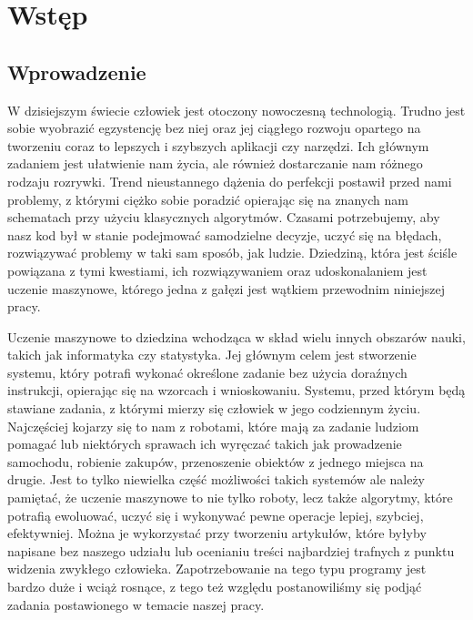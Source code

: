 \chapter{Wstęp}
\label{cha:wstep}

\section{Wprowadzenie}
\label{sec:wprowadzenie}

W dzisiejszym świecie człowiek jest otoczony nowoczesną technologią. Trudno jest sobie wyobrazić egzystencję bez niej oraz jej ciągłego rozwoju opartego na tworzeniu coraz to lepszych i szybszych aplikacji czy narzędzi. Ich głównym zadaniem jest ułatwienie nam życia, ale również dostarczanie nam różnego rodzaju rozrywki. Trend nieustannego dążenia do perfekcji postawił przed nami problemy, z którymi ciężko sobie poradzić opierając się na znanych nam schematach przy użyciu klasycznych algorytmów. Czasami potrzebujemy, aby nasz kod był w stanie podejmować samodzielne decyzje, uczyć się na błędach, rozwiązywać problemy w taki sam sposób, jak ludzie. Dziedziną, która jest ściśle powiązana z tymi kwestiami, ich rozwiązywaniem oraz udoskonalaniem jest uczenie maszynowe, którego jedna z gałęzi jest wątkiem przewodnim niniejszej pracy.
    
    Uczenie maszynowe to dziedzina wchodząca w skład wielu innych obszarów nauki, takich jak informatyka czy statystyka. Jej głównym celem jest stworzenie systemu, który potrafi wykonać określone zadanie bez użycia doraźnych instrukcji, opierając się na wzorcach i wnioskowaniu. Systemu, przed którym będą stawiane zadania, z którymi mierzy się człowiek w jego codziennym życiu. Najczęściej kojarzy się to nam z robotami, które mają za zadanie ludziom pomagać lub niektórych sprawach ich wyręczać takich jak prowadzenie samochodu, robienie zakupów, przenoszenie obiektów z jednego miejsca na drugie. Jest to tylko niewielka część możliwości takich systemów ale należy pamiętać, że uczenie maszynowe to nie tylko roboty, lecz także algorytmy, które potrafią ewoluować, uczyć się i wykonywać pewne operacje lepiej, szybciej, efektywniej. Można je wykorzystać przy tworzeniu artykułów, które byłyby napisane bez naszego udziału lub ocenianiu treści najbardziej trafnych z punktu widzenia zwykłego człowieka. Zapotrzebowanie na tego typu programy jest bardzo duże i wciąż rosnące, z tego też względu postanowiliśmy się podjąć zadania postawionego w temacie naszej pracy.

